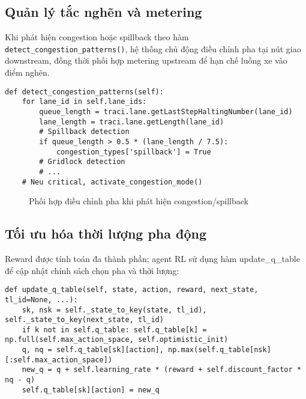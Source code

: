 \subsection{Quản lý tắc nghẽn và metering}

Khi phát hiện congestion hoặc spillback theo hàm \texttt{detect\_congestion\_patterns()}, hệ thống chủ động điều chỉnh pha tại nút giao downstream, đồng thời phối hợp metering upstream để hạn chế luồng xe vào điểm nghẽn.

\begin{lstlisting}[style=py,caption={Phát hiện congestion và phản ứng}]
def detect_congestion_patterns(self):
    for lane_id in self.lane_ids:
        queue_length = traci.lane.getLastStepHaltingNumber(lane_id)
        lane_length = traci.lane.getLength(lane_id)
        # Spillback detection
        if queue_length > 0.5 * (lane_length / 7.5):
            congestion_types['spillback'] = True
        # Gridlock detection
        # ...
    # Neu critical, activate_congestion_mode()
\end{lstlisting}

\begin{figure}[H]
    \centering
    \caption{Phối hợp điều chỉnh pha khi phát hiện congestion/spillback}
    \label{fig:congestion_metering_flow}
\end{figure}

\subsection{Tối ưu hóa thời lượng pha động}

Reward được tính toán đa thành phần; agent RL sử dụng hàm update\_q\_table để cập nhật chính sách chọn pha và thời lượng:

\begin{lstlisting}[style=py,caption={Cập nhật Q-table và chọn pha}]
def update_q_table(self, state, action, reward, next_state, tl_id=None, ...):
    sk, nsk = self._state_to_key(state, tl_id), self._state_to_key(next_state, tl_id)
    if k not in self.q_table: self.q_table[k] = np.full(self.max_action_space, self.optimistic_init)
    q, nq = self.q_table[sk][action], np.max(self.q_table[nsk][:self.max_action_space])
    new_q = q + self.learning_rate * (reward + self.discount_factor * nq - q)
    self.q_table[sk][action] = new_q
\end{lstlisting}

